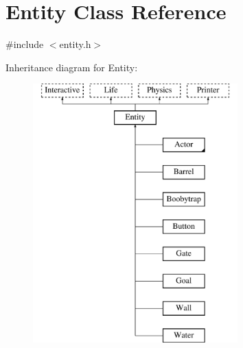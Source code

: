 \hypertarget{class_entity}{\section{Entity Class Reference}
\label{class_entity}
}


{\ttfamily \#include $<$entity.\-h$>$}

Inheritance diagram for Entity\-:\begin{figure}[H]
\begin{center}
\leavevmode
\includegraphics[height=10.000000cm]{class_entity}
\end{center}
\end{figure}
